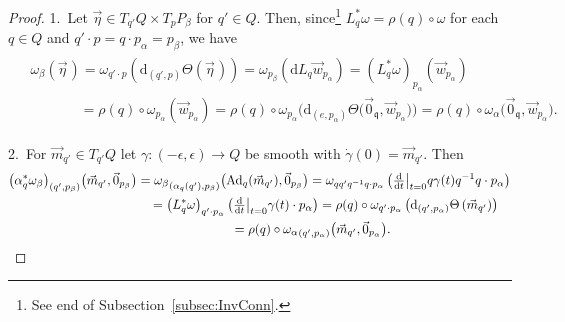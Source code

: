 \documentclass[11pt]{article}
\numberwithin{equation}{section}
\newcommand{\dttB}[2]{{\textstyle\frac{\mathrm{d}}{\mathrm{d}#1}}\big|_{#1=#2}}
\newcommand{\Co}[1]{\alpha_{#1}}
\newcommand{\Add}[1]{\mathrm{Ad}_{#1}}
\begin{document}
\begin{proof}
1.~Let $\vec{\eta}\in T_{q'}Q\times T_pP_\beta$ for $q'\in Q$.
Then, since\footnote{See end of Subsection~\ref{subsec:InvConn}.} $L_q^{*}\omega = \rho(q)\circ \omega$ for each $q\in Q$
and $q'\cdot p= q\cdot p_\alpha =p_\beta$, we have
\begin{gather*}
\begin{split}
&\omega_\beta(\vec{\eta}\hspace{1pt})=\omega_{q'\cdot p}(\mathrm{d}_{(q', p)}\Theta (\vec{\eta}\hspace{1pt}))=\omega_{p_\beta}(\mathrm{d}
L_q\vec{w}_{p_\alpha}) =(L_q^{*}\omega)_{p_\alpha}(\vec{w}_{p_\alpha})
\\
&\phantom{\omega_\beta(\vec{\eta})}=\rho(q)\circ \omega_{p_\alpha}(\vec{w}_{p_\alpha})=\rho(q)\circ \omega_{p_\alpha}\big(\mathrm{d}_{(e,p_\alpha)}\Theta
\big(\vec{0}_\mathfrak{q},\vec{w}_{p_\alpha}\big)\big)
=\rho(q)\circ
\omega_{\alpha}\big(\vec{0}_\mathfrak{q},\vec{w}_{p_\alpha}\big).
\end{split}
\end{gather*}

2.~For $\vec{m}_{q'} \in T_{q'}Q$ let $\gamma \colon (-\epsilon,\epsilon)\rightarrow Q$ be smooth with
$\dot\gamma(0)=\vec{m}_{q'}$.
Then
\begin{gather*}
\big(\Co{q}^{*}\omega_\beta
\big)_{(q',p_\beta)}\big(\vec{m}_{q'},\vec{0}_{p_\beta}\big)
={\omega_\beta}_{(\Co{q}(q'),p_\beta)}\big(\Add{q}(\vec{m}_{q'}),\vec{0}_{p_\beta}\big)
=\omega_{qq'q^{-1}q\cdot p_\alpha }\left(\dttB{t}{0}q\gamma(t) q^{-1}q\cdot p_\alpha\right)
\\
\hphantom{\big(\Co{q}^{*}\omega_\beta
\big)_{(q',p_\beta)}\big(\vec{m}_{q'},\vec{0}_{p_\beta}\big)}{}
=\left(L_q^{*}\omega\right)_{q'\cdot p_\alpha }\left(\dttB{t}{0}\gamma(t)\cdot p_\alpha\right)
=\rho(q)\circ \omega_{q'\cdot p_\alpha}\left(\mathrm{d}_{(q',p_\alpha)}\Theta\left( \vec{m}_{q'}\right)\right)
\\
\hphantom{\big(\Co{q}^{*}\omega_\beta
\big)_{(q',p_\beta)}\big(\vec{m}_{q'},\vec{0}_{p_\beta}\big)}{}
=\rho(q)\circ {\omega_\alpha}_{(q',p_\alpha)} \big(\vec{m}_{q'},\vec{0}_{p_\alpha}\big).\tag*{\qed}
\end{gather*}
\renewcommand{\qed}{}
\end{proof}
\end{document}
